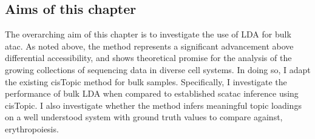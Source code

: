 \subsection{Aims of this chapter}

The overarching aim of this chapter is to investigate the use of LDA for bulk \gls{atac}. As noted above, the method represents a significant advancement above differential accessibility, and shows theoretical promise for the analysis of the growing collections of sequencing data in diverse cell systems. In doing so, I adapt the existing cisTopic method for bulk samples. Specifically, I investigate the performance of bulk LDA when compared to established \gls{scatac} inference using cisTopic. I also investigate whether the method infers meaningful topic loadings on a well understood system with ground truth values to compare against, erythropoiesis.   




